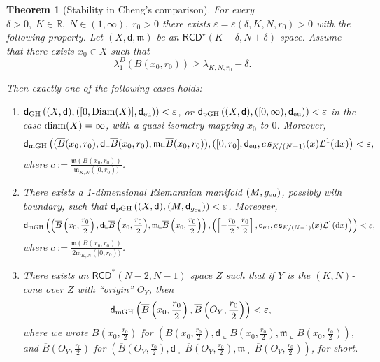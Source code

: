 \documentclass[12pt]{article}
\newcommand{\R}{\mathbb{R}}
\newcommand{\dd}{\mathrm{d}}
\newcommand{\RCD}{\mathsf{RCD}}
\newcommand{\mm}{\mathfrak m}
\newcommand{\di}{\mathsf{d}}
\newcommand{\sfd}{\mathsf d}
\theoremstyle{plain}
\newtheorem{theorem}[lemma]{Theorem}
\theoremstyle{definition}
\begin{document}
\begin{theorem}[Stability in Cheng's comparison]\label{th: Cheng dir-Stab}
For every $\delta>0,\;K\in \R,\; N\in (1,\infty),\; r_0>0$ there exists $\varepsilon=\varepsilon(\delta, K, N, r_0)>0$ with the following property.
Let $(X,\di,\mm)$ be an $\RCD^{\star}(K-\delta,N+\delta)$ space.  Assume that there exists $x_0\in X$ such that
\begin{equation*}
\lambda_1^D(B(x_0,r_0))\geq  \lambda_{K,N,r_0}-\delta.
\end{equation*} 

Then exactly one of the following cases holds:
\begin{enumerate}
\item  $\sfd_{\rm GH }\left((X, \sfd), ([0,{\rm Diam}(X)], \sfd_{\rm eu})\right)<\varepsilon$, or  $\sfd_{\rm pGH }\left((X, \sfd), ([0,\infty), \sfd_{\rm eu })\right)<\varepsilon$ in the case ${\rm diam}(X)=\infty$, with a quasi isometry mapping $x_0$ to $0$. Moreover, 
{\small
$$
\sfd_{\rm mGH }\left((\overline{B}(x_0, r_0), \sfd\llcorner{\overline{B}(x_0, r_0)}, \mm\llcorner{\overline{B}(x_0, r_0)}), ([0,r_0], \sfd_{\rm eu }, c\, \mathfrak{s}_{K/(N-1)}(x) \mathcal{L}^1(\dd x)  \right)<\varepsilon,$$} where $c:=\frac{\mm(B(x_0, r_0))}{\mm_{K,N}([0,r_0))}$.
\item There exists a 1-dimensional Riemannian manifold $(M,g_{\rm eu })$, possibly with boundary, such that $\sfd_{\rm pGH }\left((X, \sfd), (M, \sfd_{g_{\rm eu }})\right)<\varepsilon$. Moreover,  
{\footnotesize{$$\sfd_{\rm mGH }\left(\left(\overline{B}\left(x_0, \frac{r_0}{2}\right), \sfd\llcorner{\overline{B}\left(x_0, \frac{r_0}{2}\right)}, \mm\llcorner{\overline{B}\left(x_0, \frac{r_0}{2}\right)}\right), \left(\left[-\frac{r_0}{2},\frac{r_0}{2}\right], \sfd_{\rm eu }, c\, \mathfrak{s}_{K/(N-1)}(x) \mathcal{L}^1(\dd x)  \right) \right)<\varepsilon,$$}} 
where $c:=\frac{\mm(B(x_0, r_0))}{2\mm_{K,N}([0,r_0))}$.
\item There exists an $\RCD^*(N-2,N-1)$ space $Z$ such that if $Y$ is the $(K,N)$-cone over $Z$ with ``origin''  $O_Y$, then
$$
\sfd_{\rm mGH }\left(\overline{B}\left(x_0, \frac{r_0}{2}\right), \overline{B}\left(O_Y, \frac{r_0}{2}\right)  \right)<\varepsilon,
$$
where we wrote $\overline{B}\left(x_0, \frac{r_0}{2}\right)$ for $\left(\overline{B}\left(x_0, \frac{r_0}{2}\right), \sfd\llcorner{\overline{B}\left(x_0, \frac{r_0}{2}\right)}, \mm\llcorner{\overline{B}\left(x_0, \frac{r_0}{2}\right)} \right)$, and $\overline{B}\left(O_Y, \frac{r_0}{2}\right)$ for $\left(\overline{B}\left(O_Y, \frac{r_0}{2}\right), \sfd\llcorner{\overline{B}\left(O_Y, \frac{r_0}{2}\right)}, \mm\llcorner{\overline{B}\left(O_Y, \frac{r_0}{2}\right)} \right)$, for short.
\end{enumerate}
\end{theorem} 
\end{document}
